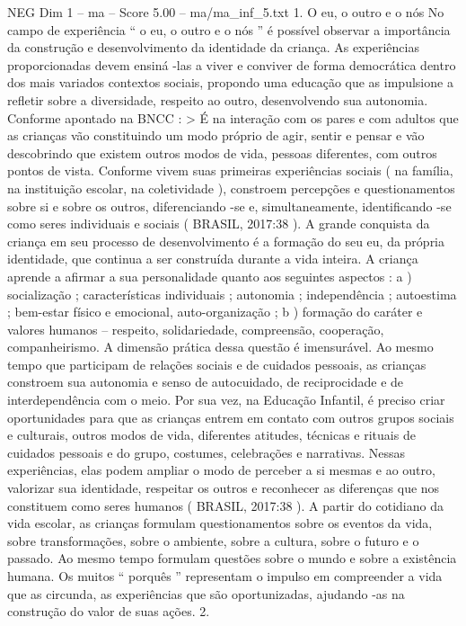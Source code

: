 \begin{textsample}{NEG Dim 1 – ma – Score 5.00 – ma/ma\_inf\_5.txt}  \label{ex:f1_neg_225}
1.
O eu, o outro e o nós No campo de experiência “ o eu, o outro e o nós ” é possível observar a importância da construção e desenvolvimento da identidade da criança.
As experiências proporcionadas devem ensiná -las a viver e conviver de forma democrática dentro dos mais variados contextos sociais, propondo uma educação que as impulsione a refletir sobre a diversidade, respeito ao outro, desenvolvendo sua autonomia.
Conforme apontado na BNCC : > É na interação com os pares e com adultos que as crianças vão constituindo um modo próprio de agir, sentir e pensar e vão descobrindo que existem outros modos de vida, pessoas diferentes, com outros pontos de vista.
Conforme vivem suas primeiras experiências sociais ( na família, na instituição escolar, na coletividade ), constroem percepções e questionamentos sobre si e sobre os outros, diferenciando -se e, simultaneamente, identificando -se como seres individuais e sociais ( BRASIL, 2017:38 ).
A grande conquista da criança em seu processo de desenvolvimento é a formação do seu eu, da própria identidade, que continua a ser construída durante a vida inteira.
A criança aprende a afirmar a sua personalidade quanto aos seguintes aspectos : a ) socialização ; características individuais ; autonomia ; independência ; autoestima ; bem-estar físico e emocional, auto-organização ; b ) formação do caráter e valores humanos – respeito, solidariedade, compreensão, cooperação, companheirismo.
A dimensão prática dessa questão é imensurável.
Ao mesmo tempo que participam de relações sociais e de cuidados pessoais, as crianças constroem sua autonomia e senso de autocuidado, de reciprocidade e de interdependência com o meio.
Por sua vez, na Educação Infantil, é preciso criar oportunidades para que as crianças entrem em contato com outros grupos sociais e culturais, outros modos de vida, diferentes atitudes, técnicas e rituais de cuidados pessoais e do grupo, costumes, celebrações e narrativas.
Nessas experiências, elas podem ampliar o modo de perceber a si mesmas e ao outro, valorizar sua identidade, respeitar os outros e reconhecer as diferenças que nos constituem como seres humanos ( BRASIL, 2017:38 ).
A partir do cotidiano da vida escolar, as crianças formulam questionamentos sobre os eventos da vida, sobre transformações, sobre o ambiente, sobre a cultura, sobre o futuro e o passado.
Ao mesmo tempo formulam questões sobre o mundo e sobre a existência humana.
Os muitos “ porquês ” representam o impulso em compreender a vida que as circunda, as experiências que são oportunizadas, ajudando -as na construção do valor de suas ações. 2.

\end{textsample}
